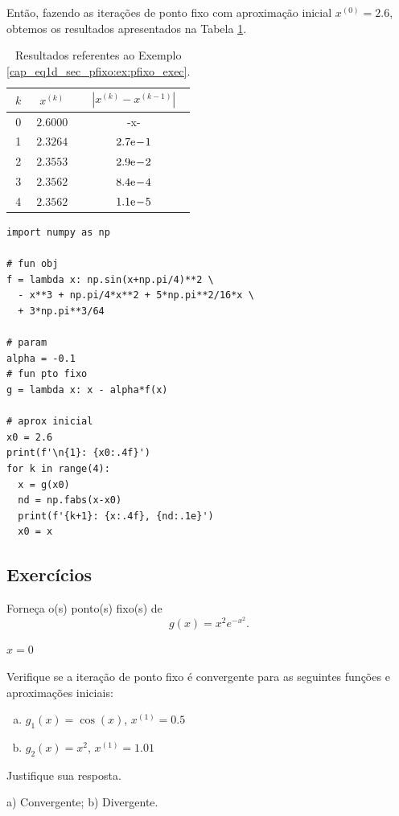\begin{ex}
Então, fazendo as iterações de ponto fixo com aproximação inicial $x^{(0)}=2.6$, obtemos os resultados apresentados na Tabela \ref{cap_eq1d_sec_pfixo:tab:ex_pfixo_exec}.

\begin{table}[H]
  \centering
  \caption{Resultados referentes ao Exemplo \ref{cap_eq1d_sec_pfixo:ex:pfixo_exec}.}
  \label{cap_eq1d_sec_pfixo:tab:ex_pfixo_exec}
  \begin{tabular}{r|cc}
    $k$ & $x^{(k)}$ & $|x^{(k)}-x^{(k-1)}|$ \\\hline
    0 & $2.6000$ & -x-\\
    1 & $2.3264$ & $2.7\mathrm{e}\!-\!1$ \\
    2 & $2.3553$ & $2.9\mathrm{e}\!-\!2$ \\
    3 & $2.3562$ & $8.4\mathrm{e}\!-\!4$ \\
    4 & $2.3562$ & $1.1\mathrm{e}\!-\!5$ \\\hline
  \end{tabular}
\end{table}

\begin{lstlisting}
import numpy as np

# fun obj
f = lambda x: np.sin(x+np.pi/4)**2 \
  - x**3 + np.pi/4*x**2 + 5*np.pi**2/16*x \
  + 3*np.pi**3/64

# param
alpha = -0.1
# fun pto fixo
g = lambda x: x - alpha*f(x)

# aprox inicial
x0 = 2.6
print(f'\n{1}: {x0:.4f}')
for k in range(4):
  x = g(x0)
  nd = np.fabs(x-x0)
  print(f'{k+1}: {x:.4f}, {nd:.1e}')
  x0 = x
\end{lstlisting}

\end{ex}

\subsection{Exercícios}

\begin{exer}
  Forneça o(s) ponto(s) fixo(s) de
  \begin{equation}
    g(x) = x^2e^{-x^2}.
  \end{equation}
\end{exer}
\begin{resp}
  $x=0$
\end{resp}

\begin{exer}
  Verifique se a iteração de ponto fixo é convergente para as seguintes funções e aproximações iniciais:
  \begin{enumerate}[a)]
  \item $g_1(x) = \cos(x)$, $x^{(1)} = 0.5$
  \item $g_2(x) = x^2$, $x^{(1)} = 1.01$
  \end{enumerate}
  Justifique sua resposta.
\end{exer}
\begin{resp}
  a) Convergente; b) Divergente.
\end{resp}

